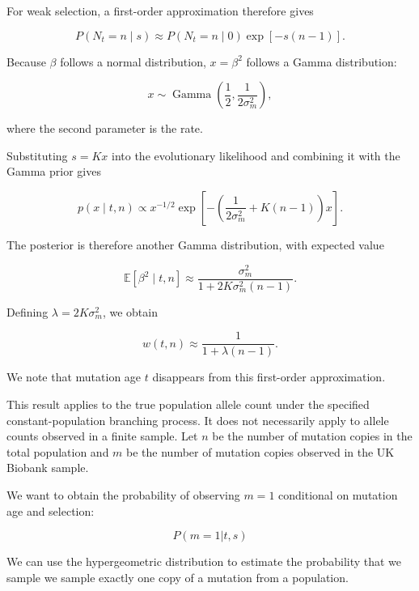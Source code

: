 \documentclass{article}
\begin{document}
For weak selection, a first-order approximation therefore gives

\begin{equation}
P(N_t=n\mid s)
\approx
P(N_t=n\mid 0)\exp[-s(n-1)].
\end{equation}

Because $\beta$ follows a normal distribution, $x=\beta^2$ follows a Gamma distribution:

\begin{equation}
x\sim\operatorname{Gamma}
\left(\frac12,\frac{1}{2\sigma_m^2}\right),
\end{equation}

where the second parameter is the rate.

Substituting $s=Kx$ into the evolutionary likelihood and combining it with the Gamma prior gives

\begin{equation}
p(x\mid t,n)
\propto
x^{-1/2}
\exp\left[
-\left(
\frac{1}{2\sigma_m^2}+K(n-1)
\right)x
\right].
\end{equation}

The posterior is therefore another Gamma distribution, with expected value

\begin{equation}
\mathbb{E}[\beta^2\mid t,n]
\approx
\frac{\sigma_m^2}
{1+2K\sigma_m^2(n-1)}.
\end{equation}

Defining $\lambda=2K\sigma_m^2$, we obtain

\begin{equation}
w(t,n)\approx
\frac{1}{1+\lambda(n-1)}
.
\end{equation}

We note that mutation age $t$ disappears from this first-order approximation.

This result applies to the true population allele count under the specified constant-population branching process. It does not necessarily apply to allele counts observed in a finite sample. Let $n$ be the number of mutation copies in the total population and $m$ be the number of mutation copies observed in the UK Biobank sample.

We want to obtain the probability of observing $m=1$ conditional on mutation age and selection:

\begin{equation}
    P(m=1 | t, s)
\end{equation}

We can use the hypergeometric distribution to estimate the probability that we sample we sample exactly one copy of a mutation from a population.
\end{document}
